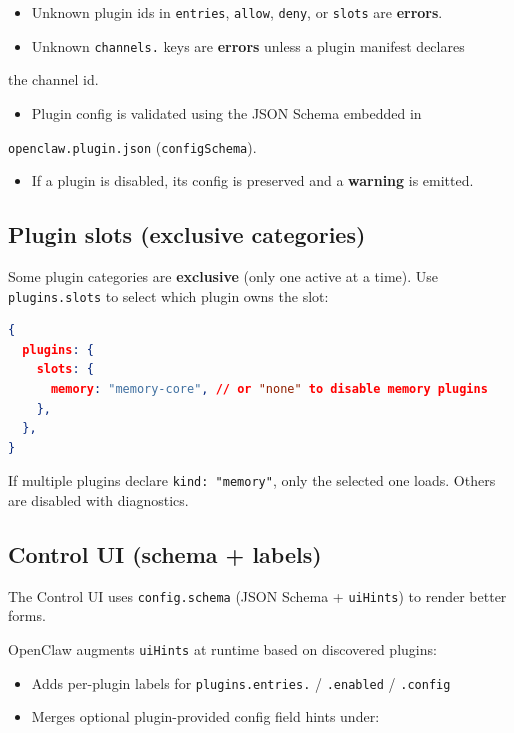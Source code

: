 \begin{itemize}
  \item Unknown plugin ids in \texttt{entries}, \texttt{allow}, \texttt{deny}, or \texttt{slots} are \textbf{errors}.
  \item Unknown \texttt{channels.} keys are \textbf{errors} unless a plugin manifest declares
\end{itemize}

the channel id.
\begin{itemize}
  \item Plugin config is validated using the JSON Schema embedded in
\end{itemize}

\texttt{openclaw.plugin.json} (\texttt{configSchema}).
\begin{itemize}
  \item If a plugin is disabled, its config is preserved and a \textbf{warning} is emitted.
\end{itemize}


\subsection{Plugin slots (exclusive categories)}


Some plugin categories are \textbf{exclusive} (only one active at a time). Use
\texttt{plugins.slots} to select which plugin owns the slot:

\begin{lstlisting}[language=json]
{
  plugins: {
    slots: {
      memory: "memory-core", // or "none" to disable memory plugins
    },
  },
}
\end{lstlisting}


If multiple plugins declare \texttt{kind: "memory"}, only the selected one loads. Others
are disabled with diagnostics.

\subsection{Control UI (schema + labels)}


The Control UI uses \texttt{config.schema} (JSON Schema + \texttt{uiHints}) to render better forms.

OpenClaw augments \texttt{uiHints} at runtime based on discovered plugins:

\begin{itemize}
  \item Adds per-plugin labels for \texttt{plugins.entries.} / \texttt{.enabled} / \texttt{.config}
  \item Merges optional plugin-provided config field hints under:
\end{itemize}

